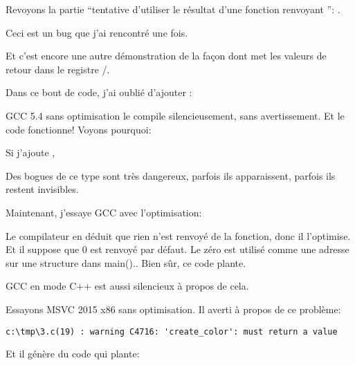 \label{ForgottenReturn}

Revoyons la partie ``tentative d'utiliser le résultat d'une fonction renvoyant \Tvoid'': .

Ceci est un bug que j'ai rencontré une fois.

Et c'est encore une autre démonstration de la façon dont \CCpp{} met les valeurs de
retour dans le registre \EAX/\RAX.

Dans ce bout de code, j'ai oublié d'ajouter :



GCC 5.4 sans optimisation le compile silencieusement, sans avertissement.
Et le code fonctionne!
Voyons pourquoi:



Si j'ajoute , 



Des bogues de ce type sont très dangereux, parfois ils apparaissent, parfois ils
restent invisibles.

Maintenant, j'essaye GCC avec l'optimisation:



Le compilateur en déduit que rien n'est renvoyé de la fonction, donc il l'optimise.
Et il suppose que 0 est renvoyé par défaut. Le zéro est utilisé comme une adresse
sur une structure dans main()..
Bien sûr, ce code plante.

GCC en mode C++ est aussi silencieux à propos de cela.

Essayons MSVC 2015 x86 sans optimisation.
Il averti à propos de ce problème:

\begin{lstlisting}
c:\tmp\3.c(19) : warning C4716: 'create_color': must return a value
\end{lstlisting}

Et il génère du code qui plante:



